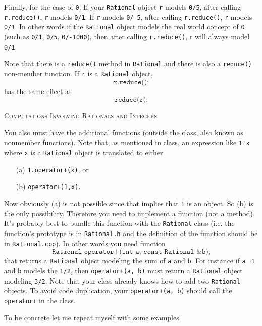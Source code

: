 Finally, for the case of \texttt{0}.
If your \texttt{Rational} object \texttt{r} models \texttt{0/5},
after calling \texttt{r.reduce()}, \texttt{r} models \texttt{0/1}.
If \texttt{r} models \texttt{0/-5}, after calling \texttt{r.reduce()},
\texttt{r} models \texttt{0/1}.
In other words if the \texttt{Rational} object models the real world
concept of \texttt{0} (such as \texttt{0/1}, \texttt{0/5}, \texttt{0/-1000}),
then after calling \texttt{r.reduce()}, r will always model \texttt{0/1}.

Note that there is a \texttt{reduce()} method in \texttt{Rational} and
there is also a \texttt{reduce()}
non-member function. If \texttt{r} is a \texttt{Rational} object,
\[
\texttt{r.reduce();}
\]
has the same effect as
\[
\texttt{reduce(r);}
\]




\newpage
\textsc{Computations Involving Rationals and Integers}

You also must have the additional functions (outside the class,
also known as nonmember functions).
Note that, as mentioned in class, an
expression like \texttt{1+x} where \texttt{x} is a
\texttt{Rational} object is translated to either  
\begin{itemize}
\item[(a)] \texttt{1.operator+(x)},  or 
\item[(b)] \texttt{operator+(1,x)}. 
\end{itemize}

Now obviously (a) is not possible since that implies that
\texttt{1} is an object.
So (b) is
the only possibility.
Therefore you need to implement a function (not a method).
It's probably best to bundle this function with the
\texttt{Rational} class (i.e. the function's prototype is in
\texttt{Rational.h} and the definition of the function should be in
\texttt{Rational.cpp}). In other words you need function
\[
\texttt{Rational operator+(int a, const Rational \& b);}
\]
that returns a \texttt{Rational} object modeling the sum of
\texttt{a} and \texttt{b}.
For instance if \texttt{a}=\texttt{1} and \texttt{b} models the \texttt{1/2},
then \texttt{operator+(a, b)}
must return a \texttt{Rational} object modeling \texttt{3/2}.
Note that your class already knows how to add two
\texttt{Rational} objects.
To avoid code duplication, your \texttt{operator+(a, b)}
should call the \texttt{operator+} in the class.

To be concrete let me repeat myself with some examples.


